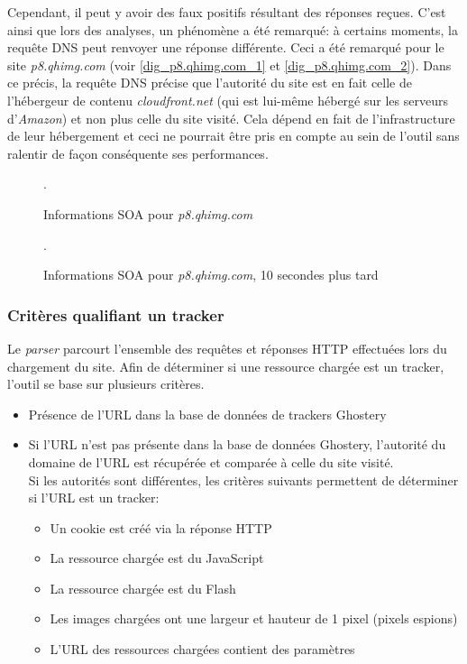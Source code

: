 Cependant, il peut y avoir des faux positifs résultant des réponses reçues. C'est ainsi que lors des analyses, un phénomène a été remarqué: à certains moments, la requête DNS peut renvoyer une réponse différente. Ceci a été remarqué pour le site \textit{p8.qhimg.com} (voir \autoref{dig_p8.qhimg.com_1} et \autoref{dig_p8.qhimg.com_2}). Dans ce précis, la requête DNS précise que l'autorité du site est en fait celle de l'hébergeur de contenu \textit{cloudfront.net} (qui est lui-même hébergé sur les serveurs d'\textit{Amazon}) et non plus celle du site visité. Cela dépend en fait de l'infrastructure de leur hébergement et ceci ne pourrait être pris en compte au sein de l'outil sans ralentir de façon conséquente ses performances.

\begin{figure}[h]
	\centering
	
	\caption{\label{dig_p8.qhimg.com_1}Informations SOA pour \textit{p8.qhimg.com}}.
\end{figure}

\begin{figure}[h]
	\centering
	
	\caption{\label{dig_p8.qhimg.com_2}Informations SOA pour \textit{p8.qhimg.com}, 10 secondes plus tard}.
\end{figure}

\subsubsection{Critères qualifiant un tracker}
Le \textit{parser} parcourt l'ensemble des requêtes et réponses HTTP effectuées lors du chargement du site. Afin de déterminer si une ressource chargée est un tracker, l'outil se base sur plusieurs critères.
\begin{itemize}
  \renewcommand{\labelitemi}{$\Rightarrow$}
 \item Présence de l'URL dans la base de données de trackers Ghostery
 \item Si l'URL n'est pas présente dans la base de données Ghostery, l'autorité du domaine de l'URL est récupérée et comparée à celle du site visité.\\
		Si les autorités sont différentes, les critères suivants permettent de déterminer si l'URL est un tracker:
		\begin{itemize}
			\item Un cookie est créé via la réponse HTTP
			\item La ressource chargée est du JavaScript
			\item La ressource chargée est du Flash
			\item Les images chargées ont une largeur et hauteur de 1 pixel (pixels espions)
			\item L'URL des ressources chargées contient des paramètres
			\newline
		\end{itemize}
\end{itemize}

